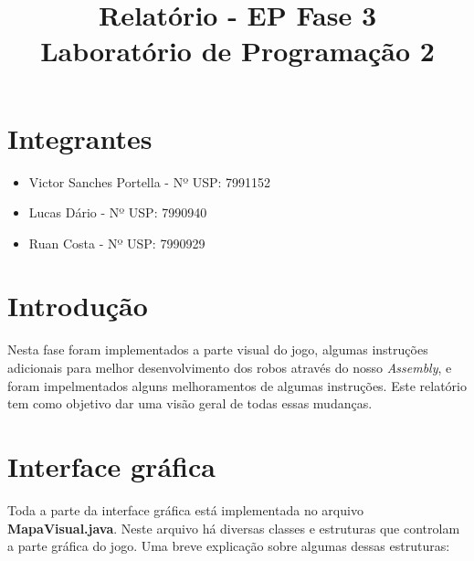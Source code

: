 \documentclass[11pt]{article}
\title{Relatório - EP Fase 3 \\ Laboratório de Programação 2}
\begin{document}
\maketitle

\section{Integrantes}

\begin{itemize}

\item Victor Sanches Portella - Nº USP: 7991152

\item Lucas Dário - Nº USP: 7990940

\item Ruan Costa - Nº USP: 7990929

\end{itemize}

\section{Introdução}

Nesta fase foram implementados a parte visual do jogo, algumas instruções adicionais para melhor desenvolvimento dos robos através do nosso \emph{Assembly}, e foram impelmentados alguns melhoramentos de algumas instruções. Este relatório tem como objetivo dar uma visão geral de todas essas mudanças.

\section{Interface gráfica}

Toda a parte da interface gráfica está implementada no arquivo \textbf{\color{red}MapaVisual.java}. Neste arquivo há diversas classes e estruturas que controlam a parte gráfica do jogo. Uma breve explicação sobre algumas dessas estruturas:
\end{document}
